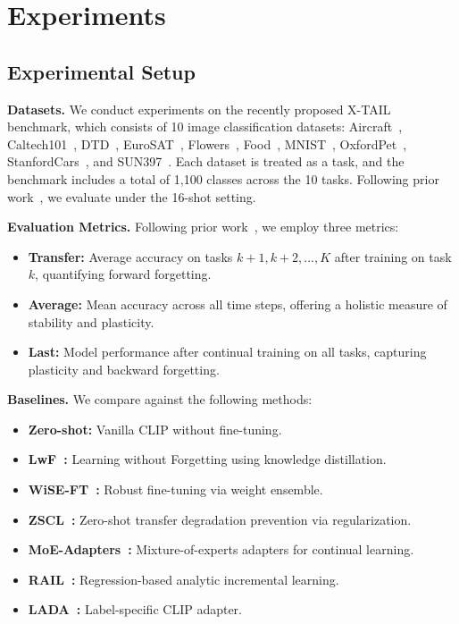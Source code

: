 \documentclass{article}
\begin{document}
\section{Experiments}
\label{sec:experiments}

\subsection{Experimental Setup}

\textbf{Datasets.}
We conduct experiments on the recently proposed X-TAIL~\cite{xu2024rail} benchmark, which consists of 10 image classification datasets: Aircraft~\cite{maji2013fine}, Caltech101~\cite{fei2004learning}, DTD~\cite{cimpoi2014describing}, EuroSAT~\cite{helber2019eurosat}, Flowers~\cite{nilsback2008automated}, Food~\cite{bossard2014food}, MNIST~\cite{deng2012mnist}, OxfordPet~\cite{parkhi2012cats}, StanfordCars~\cite{krause2013collecting}, and SUN397~\cite{xiao2010sun}. Each dataset is treated as a task, and the benchmark includes a total of 1,100 classes across the 10 tasks. Following prior work~\cite{zheng2023zscl}, we evaluate under the 16-shot setting.

\textbf{Evaluation Metrics.}
Following prior work~\cite{zheng2023zscl}, we employ three metrics:
\begin{itemize}
    \item \textbf{Transfer:} Average accuracy on tasks $k+1, k+2, ..., K$ after training on task $k$, quantifying forward forgetting.
    \item \textbf{Average:} Mean accuracy across all time steps, offering a holistic measure of stability and plasticity.
    \item \textbf{Last:} Model performance after continual training on all tasks, capturing plasticity and backward forgetting.
\end{itemize}

\textbf{Baselines.}
We compare against the following methods:
\begin{itemize}
    \item \textbf{Zero-shot:} Vanilla CLIP without fine-tuning.
    \item \textbf{LwF~\cite{li2017learning}:} Learning without Forgetting using knowledge distillation.
    \item \textbf{WiSE-FT~\cite{wortsman2022robust}:} Robust fine-tuning via weight ensemble.
    \item \textbf{ZSCL~\cite{zheng2023zscl}:} Zero-shot transfer degradation prevention via regularization.
    \item \textbf{MoE-Adapters~\cite{yu2024moe}:} Mixture-of-experts adapters for continual learning.
    \item \textbf{RAIL~\cite{xu2024rail}:} Regression-based analytic incremental learning.
    \item \textbf{LADA~\cite{luo2025lada}:} Label-specific CLIP adapter.
\end{itemize}
\end{document}
